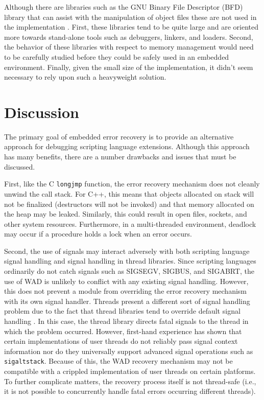 Although there are libraries such as the GNU Binary File Descriptor
(BFD) library that can assist with the manipulation of object files
these are not used in the implementation \cite{bfd}.  First, these
libraries tend to be quite large and are oriented more towards
stand-alone tools such as debuggers, linkers, and loaders.  Second,
the behavior of these libraries with respect to memory management
would need to be carefully studied before they could be safely used in
an embedded environment. Finally, given the small size of the
implementation, it didn't seem necessary to rely upon such a
heavyweight solution.

\section{Discussion}

The primary goal of embedded error recovery is to provide an
alternative approach for debugging scripting language extensions.
Although this approach has many benefits, there are a number
drawbacks and issues that must be discussed.

First, like the C {\tt longjmp} function, the error recovery mechanism
does not cleanly unwind the call stack.  For C++, this means that
objects allocated on stack will not be finalized (destructors will not
be invoked) and that memory allocated on the heap may be
leaked. Similarly, this could result in open files, sockets, and other
system resources. Furthermore, in a multi-threaded environment,
deadlock may occur if a procedure holds a lock when an error occurs.

Second, the use of signals may interact adversely with both scripting
language signal handling and signal handling in thread libraries.
Since scripting languages ordinarily do not catch signals such as
SIGSEGV, SIGBUS, and SIGABRT, the use of WAD is unlikely to conflict
with any existing signal handling. However, this does not prevent a
module from overriding the error recovery mechanism with its own
signal handler. Threads present a different sort of signal handling problem
due to the fact that thread libraries tend to override default signal handling \cite{thread}.
In this case, the thread library directs fatal signals to the thread in which the problem occurred.
However, first-hand experience has shown that certain implementations
of user threads do not reliably pass signal context information nor do
they universally support advanced signal operations such as {\tt
sigaltstack}.  Because of this, the WAD recovery mechanism may not be
compatible with a crippled implementation of user threads on certain
platforms.  To further complicate matters, the recovery process itself is
not thread-safe (i.e., it is not possible to concurrently handle fatal errors
occurring different threads).

